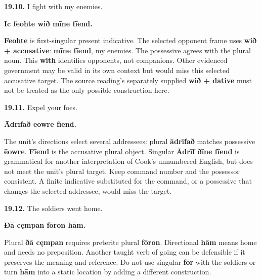 \par\begin{minipage}{\linewidth}\raggedright
\textbf{19.10.} I fight with my enemies.

\textbf{Ic feohte wið mīne fīend.}

\textbf{Feohte} is first-singular present indicative. The selected opponent frame uses \textbf{wið + accusative}: \textbf{mīne fīend}, my enemies. The possessive agrees with the plural noun. This \textbf{with} identifies opponents, not companions. Other evidenced government may be valid in its own context but would miss this selected accusative target. The source reading's separately supplied \textbf{wið + dative} must not be treated as the only possible construction here.

\end{minipage}\par\addvspace{4pt}

\par\begin{minipage}{\linewidth}\raggedright
\textbf{19.11.} Expel your foes.

\textbf{Ādrīfað ēowre fīend.}

The unit's directions select several addressees: plural \textbf{ādrīfað} matches possessive \textbf{ēowre}. \textbf{Fīend} is the accusative plural object. Singular \textbf{Ādrīf ðīne fīend} is grammatical for another interpretation of Cook's unnumbered English, but does not meet the unit's plural target. Keep command number and the possessor consistent. A finite indicative substituted for the command, or a possessive that changes the selected addressee, would miss the target.

\end{minipage}\par\addvspace{4pt}

\par\begin{minipage}{\linewidth}\raggedright
\textbf{19.12.} The soldiers went home.

\textbf{Ðā cęmpan fōron hām.}

Plural \textbf{ðā cęmpan} requires preterite plural \textbf{fōron}. Directional \textbf{hām} means home and needs no preposition. Another taught verb of going can be defensible if it preserves the meaning and reference. Do not use singular \textbf{fōr} with the soldiers or turn \textbf{hām} into a static location by adding a different construction.

\end{minipage}\par\addvspace{4pt}

